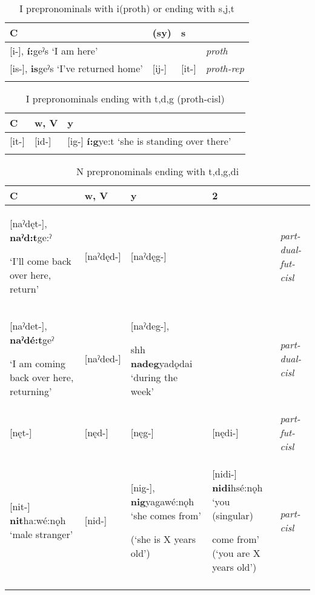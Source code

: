 
\begin{table}
\caption{I prepronominals with i(proth) or ending with s,j,t}
\label{tab:1:prothrep}
\scriptsize{
\begin{tabularx}{\textwidth}{XXXX}
\lsptoprule
C & (sy) & s & \\
\midrule
{}[i-], \textbf{í:}geˀs ‘I am here’ &  &  & {\itshape proth}\\
\midrule
{}[is-], \textbf{is}geˀs ‘I’ve returned home’ & [ij-] & [it-] & {\itshape proth-rep}\\
\lspbottomrule
\end{tabularx}}
\end{table}



\begin{table}
\caption{I prepronominals ending with t,d,g (proth-cisl)}
\label{tab:1:prothcisl}
\scriptsize{
\begin{tabularx}{\textwidth}{XXXX}
\lsptoprule
C & w, V & y\\
\midrule
{}[it-] & [id-] & [ig-] \textbf{í:g}ye:t ‘she is standing over there’\\
\lspbottomrule
\end{tabularx}}
\end{table}



\begin{table}
\caption{N prepronominals ending with t,d,g,di}
\label{tab:1:partothercisl}
\scriptsize{
\begin{tabularx}{\textwidth}{XXXXX}
\lsptoprule
C & w, V & y & 2 & \\
\midrule
{}[naˀdęt-], \textbf{naˀd\’{ę}:t}ge:ˀ 

‘I’ll come back over here, return’ & [naˀdęd-] & [naˀdęg-] &  & {\itshape part-dual-fut-cisl}\\
\midrule
{}[naˀdet-], \textbf{naˀdé:t}geˀ 

‘I am coming back over here, returning’ & [naˀded-] & [naˀdeg-], 


sh\’{ę}h \textbf{nadeg}yadǫdai ‘during the week’ &  & {\itshape part-dual-cisl}\\
\midrule
{}[nęt-] & [nęd-] & [nęg-] & [nędi-] & {\itshape part-fut-cisl}\\
\midrule
{}[nit-] \textbf{nit}ha:wé:nǫh ‘male stranger’ & [nid-] & [nig-], \textbf{nig}yagawé:nǫh ‘she comes from’ 

(‘she is X years old’) & [nidi-] \textbf{nidi}hsé:nǫh ‘you (singular) 

come from’ (‘you are X years old’) & {\itshape part-cisl}\\
\lspbottomrule
\end{tabularx}}
\end{table}


